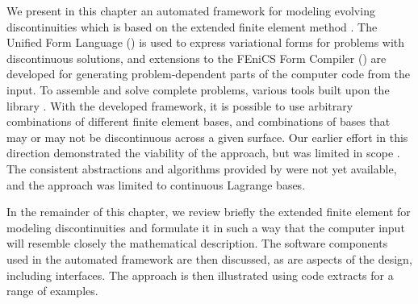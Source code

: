 We present in this chapter an automated framework for modeling
evolving discontinuities which is based on the extended finite element
method \citep{BellinSalandinRinaldo1992,moes:1999,wells:2001}.  The Unified Form
Language (\ufl) is used to express variational forms for problems with
discontinuous solutions, and extensions to the FEniCS Form Compiler (\ffc)
are developed for generating problem-dependent parts of the computer code
from the \ufl{} input. To assemble and solve complete problems, various
tools built upon the library \dolfin.  With the developed framework, it is
possible to use arbitrary combinations of different finite element bases,
and combinations of bases that may or may not be discontinuous across
a given surface. Our earlier effort in this direction demonstrated the
viability of the approach, but was limited in scope \citep{NikbakhtWells2009}.
The consistent abstractions and algorithms provided by {\ufl} were not
yet available, and the approach was limited to continuous Lagrange bases.

In the remainder of this chapter, we review briefly the extended finite
element for modeling discontinuities and formulate it in such a way that
the computer input will resemble closely the mathematical description. The
software components used in the automated framework are then discussed,
as are aspects of the design, including interfaces. The approach is then
illustrated using code extracts for a range of examples.
